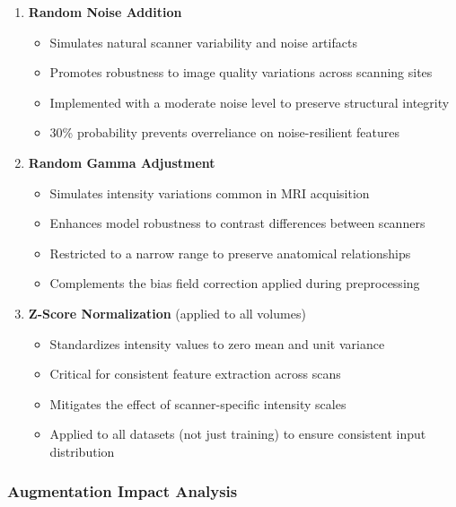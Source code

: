 \documentclass[12pt, a4paper]{article}
\begin{document}
\begin{enumerate}
    \item \textbf{Random Noise Addition}
    \begin{itemize}
        \item Simulates natural scanner variability and noise artifacts
        \item Promotes robustness to image quality variations across scanning sites
        \item Implemented with a moderate noise level to preserve structural integrity
        \item 30\% probability prevents overreliance on noise-resilient features
    \end{itemize}

    \item \textbf{Random Gamma Adjustment}
    \begin{itemize}
        \item Simulates intensity variations common in MRI acquisition
        \item Enhances model robustness to contrast differences between scanners
        \item Restricted to a narrow range to preserve anatomical relationships
        \item Complements the bias field correction applied during preprocessing
    \end{itemize}

    \item \textbf{Z-Score Normalization} (applied to all volumes)
    \begin{itemize}
        \item Standardizes intensity values to zero mean and unit variance
        \item Critical for consistent feature extraction across scans
        \item Mitigates the effect of scanner-specific intensity scales
        \item Applied to all datasets (not just training) to ensure consistent input distribution
    \end{itemize}
\end{enumerate}


\subsubsection{Augmentation Impact Analysis}
\end{document}
